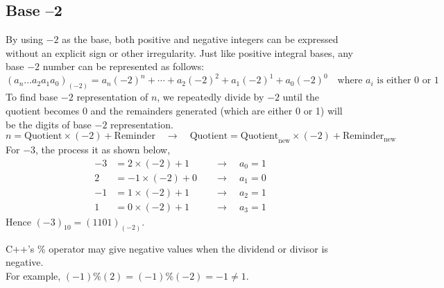 \subsection{Base --2}
By using $-2$ as the base, both positive and negative integers can be expressed without an explicit sign or other irregularity. Just like positive integral bases, any base $-2$ number can be represented as follows:
\begin{equation}
(a_n\ldots a_2a_1a_0)_{(-2)} = a_n(-2)^n+\cdots+a_2(-2)^2+a_1(-2)^1+a_0(-2)^0 \quad\text{where $a_i$ is either 0 or 1}
\end{equation}
To find base $-2$ representation of $n$, we repeatedly divide by $-2$ until the quotient becomes 0 and the remainders generated (which are either 0 or 1) will be the digits of base $-2$ representation.
\begin{equation*}
n = \text{Quotient}\times(-2) + \text{Reminder} \quad\rightarrow\quad \text{Quotient} = \text{Quotient}_{\text{new}}\times(-2) + \text{Reminder}_{\text{new}}
\end{equation*}
For $-3$, the process it as shown below,
\begin{equation*}
\begin{aligned}
-3&= 2\times(-2) + {1} &\quad\rightarrow\quad a_0 = 1\\
2&= -1\times(-2) + {0} &\quad\rightarrow\quad a_1 = 0\\
-1&= 1\times(-2) + {1} &\quad\rightarrow\quad a_2 = 1\\
1&= 0\times(-2) + {1} &\quad\rightarrow\quad a_3 = 1
\end{aligned}
\end{equation*}
Hence $(-3)_{10} = (1101)_{(-2)}$.
\begin{note}
C++'s \% operator may give negative values when the dividend or divisor is negative.\\
For example, $(-1)\%(2) = (-1)\%(-2) = -1 \neq 1$.
\end{note}

